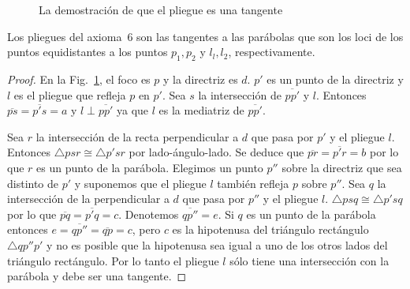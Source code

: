 \begin{figure}[thb]
\begin{center}
\end{center}
\caption{La demostración de que el pliegue es una tangente}\label{f.tangent-proof}
\end{figure}

\begin{theorem}\label{thm.parabola-tangents}
Los pliegues del axioma~$6$ son las tangentes a las parábolas que son los loci de los puntos equidistantes a los puntos $p_1,p_2$ y $l_l,l_2$, respectivamente.
\end{theorem}
\begin{proof}
En la Fig.~\ref{f.tangent-proof}, el foco es $p$ y la directriz es $d$. $p'$ es un punto de la directriz y $l$ es el pliegue que refleja $p$ en $p'$. Sea $s$ la intersección de $\overline{pp'}$ y $l$. Entonces $\overline{ps}=\overline{p's}=a$ y $l\perp \overline{pp'}$ ya que $l$ es la mediatriz de $\overline{pp'}$.

Sea $r$ la intersección de la recta perpendicular a $d$ que pasa por $p'$ y el pliegue $l$. Entonces $\triangle psr\cong \triangle p'sr$ por lado-ángulo-lado. Se deduce que 
$\overline{pr}=\overline{p'r}=b$ por lo que $r$ es un punto de la parábola. Elegimos un punto $p''$ sobre la directriz que sea distinto de $p'$ y suponemos que el pliegue $l$ también refleja $p$ sobre $p''$. Sea $q$ la intersección de la perpendicular a $d$ que pasa por $p''$ y el pliegue $l$. $\triangle psq\cong \triangle p'sq$ por lo que $\overline{pq}=\overline{p'q}=c$. Denotemos $\overline{qp''}=e$. Si $q$ es un punto de la parábola entonces $e=\overline{qp''}=\overline{qp}=c$, pero $c$ es la hipotenusa del triángulo rectángulo $\triangle qp''p'$ y no es posible que la hipotenusa sea igual a uno de los otros lados del triángulo rectángulo. Por lo tanto el pliegue $l$ sólo tiene una intersección con la parábola y debe ser una tangente.
\end{proof}

